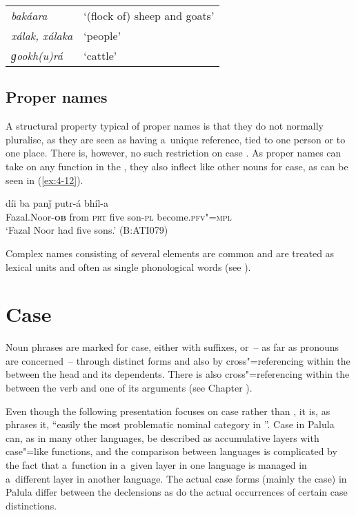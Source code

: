 \begin{table}[H]
\begin{tabularx}{\textwidth}{ l@{\hspace{40pt}} Q }
\textit{bakáara} &
`(flock of) sheep and goats'\\
\textit{xálak, xálaka} &
`people'\\
\textit{ɡookh(u)rá} &
`cattle'\\
\end{tabularx}
\end{table}

\subsection{Proper names}
\label{subsec:4-4-3}

A structural property typical of proper names is that they do not normally pluralise, as they are seen as having a~unique reference, tied to one person or to one place. There is, however, no such restriction on case . As proper names can take on any function in the , they also inflect like other nouns for case, as can be seen in (\ref{ex:4-12}).

\begin{exe}
\ex
\label{ex:4-12}
\gll [fazelnuur-á] díi ba panǰ putr-á bhíl-a \\
	Fazal.Noor-\textbf{\textsc{ob}} from \textsc{prt} five son-\textsc{pl} become.\textsc{pfv"=mpl} \\
\glt `Fazal Noor had five sons.' (B:ATI079)
\end{exe}

Complex names consisting of several elements are common and are treated as lexical units and often as single phonological words (see ).

\section{Case}
\label{sec:4-5}

Noun phrases are marked for case, either with  suffixes, or~-- as far as pronouns are concerned~-- through distinct forms and also by cross"=referencing within the   between the  head and its dependents. There is also cross"=referencing within the  between the verb and one of its arguments (see Chapter ).


Even though the following presentation focuses on case  rather than , it is, as \citet[230--231]{masica1991} phrases it, ``easily the most problematic nominal category in ''. Case in Palula can, as in many other  languages, be described as accumulative  layers with case"=like functions, and the comparison between languages is complicated by the fact that a~function in a~given layer in one language is managed in a~different layer in another language. The actual case forms (mainly the  case) in Palula differ between the declensions as do the actual occurrences of certain case distinctions. 


